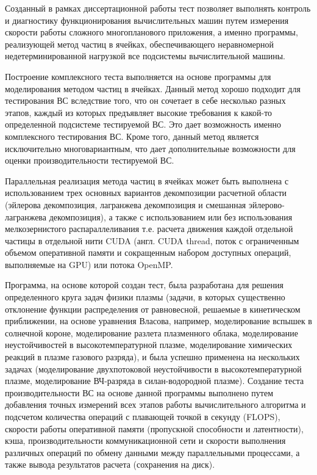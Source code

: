 Созданный в рамках диссертационной работы тест позволяет выполнять контроль и диагностику функционирования вычислительных машин путем измерения скорости работы сложного многопланового приложения, а именно программы, реализующей метод частиц в ячейках, обеспечивающего неравномерной недетерминированной нагрузкой все подсистемы вычислительной машины.

{\methods} Построение комплексного теста выполняется на основе программы для моделирования методом частиц в ячейках. Данный метод хорошо подходит для тестирования ВС вследствие того, что он сочетает в себе несколько разных этапов, каждый из которых предъявляет высокие требования к какой-то определенной подсистеме тестируемой ВС. Это дает возможность именно комплексного тестирования ВС. Кроме того, данный метод является исключительно многовариантным, что дает дополнительные возможности  для оценки производительности тестируемой ВС.

Параллельная реализация метода частиц в ячейках может быть выполнена с использованием трех основных вариантов декомпозиции расчетной области (эйлерова декомпозиция, лагранжева декомпозиция и смешанная эйлерово-лагранжева декомпозиция), а также с использованием или без использования мелкозернистого распараллеливания т.е. расчета движения каждой отдельной частицы в отдельной нити CUDA (англ. CUDA thread, поток с ограниченным объемом оперативной памяти и сокращенным набором доступных операций, выполняемые на GPU) или потока OpenMP. 

Программа, на основе которой создан тест, была разработана для решения определенного круга задач физики плазмы (задачи, в которых существенно отклонение функции распределения от равновесной, решаемые в кинетическом приближении, на основе уравнения Власова, например, моделирование вспышек в солнечной короне, моделирование разлета плазменного облака, моделирование неустойчивостей в высокотемпературной плазме, моделирование химических реакций в плазме газового разряда), и была успешно применена на нескольких задачах (моделирование двухпотоковой неустойчивости в высокотемпературной плазме, моделирование ВЧ-разряда в силан-водородной плазме). Создание теста производительности ВС на основе данной программы выполнено путем добавления точных измерений всех этапов работы вычислительного алгоритма и подсчетом количества операций с плавающей точкой в секунду (FLOPS), скорости работы оперативной памяти (пропускной способности и латентности), кэша, производительности коммуникационной сети и скорости выполнения различных операций по обмену данными между параллельными процессами, а также вывода результатов расчета (сохранения на диск).

